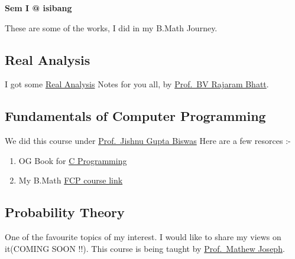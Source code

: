\documentclass[
  letterpaper,
  DIV=11,
  numbers=noendperiod]{scrreprt}
\providecommand{\tightlist}{%
  \setlength{\itemsep}{0pt}\setlength{\parskip}{0pt}}\usepackage{longtable,booktabs,array}
\begin{document}
\begin{tcolorbox}[enhanced jigsaw, breakable, rightrule=.15mm, opacityback=0, arc=.35mm, colframe=quarto-callout-important-color-frame, colback=white, toprule=.15mm, left=2mm, bottomrule=.15mm, leftrule=.75mm]

\vspace{-3mm}\textbf{Sem I @ isibang}\vspace{3mm}

These are some of the works, I did in my B.Math Journey.

\subsection*{Real Analysis}\label{real-analysis}

I got some
\href{https://drive.google.com/file/d/15aQW5bT4oBRqTgWve05l_CL1jxj97ieQ/view?usp=sharing}{Real
Analysis} Notes for you all, by
\href{https://www.isibang.ac.in/~bhat/}{Prof.~BV Rajaram Bhatt}.

\subsection*{Fundamentals of Computer
Programming}\label{fundamentals-of-computer-programming}

We did this course under
\href{https://isi.irins.org/profile/13204}{Prof.~Jishnu Gupta Biswas}
Here are a few resorces :-

\begin{enumerate}
\def\labelenumi{\arabic{enumi}.}
\tightlist
\item
  OG Book for
  \href{https://drive.google.com/file/d/1JgIz5I723BBlrkGD4n0qE4n5U89LD3XY/view?usp=sharing}{C
  Programming}
\item
  My B.Math
  \href{https://www.isibang.ac.in/~adean/infsys/database/Bmath/FCP.html}{FCP
  course link}
\end{enumerate}

\subsection*{Probability Theory}\label{probability-theory}

One of the favourite topics of my interest. I would like to share my
views on it(COMING SOON !!). This course is being taught by
\href{https://sites.google.com/view/mjoseph/home}{Prof.~Mathew Joseph}.


\end{tcolorbox}
\end{document}
